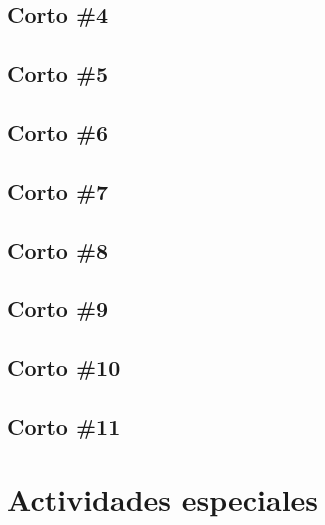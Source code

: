 \documentclass{book}
\begin{document}
\chapter{Corto \#4}


\chapter{Corto \#5}


\chapter{Corto \#6}


\chapter{Corto \#7}


\chapter{Corto \#8}



\chapter{Corto \#9}


\chapter{Corto \#10}


\chapter{Corto \#11}


\part{Actividades especiales}
\end{document}
